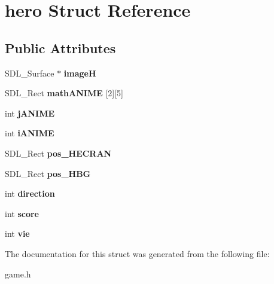 \hypertarget{structhero}{}\section{hero Struct Reference}
\label{structhero}
\subsection*{Public Attributes}
\begin{DoxyCompactItemize}
\item 
\mbox{\label{structhero_a1fdbbfab5e8472c10b6e3026dc8565f5}} 
S\+D\+L\+\_\+\+Surface $\ast$ {\bfseries imageH}
\item 
\mbox{\label{structhero_a54579c3d36a1000267157f6323a2af49}} 
S\+D\+L\+\_\+\+Rect {\bfseries math\+A\+N\+I\+ME} \mbox{[}2\mbox{]}\mbox{[}5\mbox{]}
\item 
\mbox{\label{structhero_acf230ee7f459ba30cb91bf376c5f99d1}} 
int {\bfseries j\+A\+N\+I\+ME}
\item 
\mbox{\label{structhero_a5caa2740b0db2e5b6bb7f35925d35e3c}} 
int {\bfseries i\+A\+N\+I\+ME}
\item 
\mbox{\label{structhero_ada1be34de0e476cafd482e5640b93bfe}} 
S\+D\+L\+\_\+\+Rect {\bfseries pos\+\_\+\+H\+E\+C\+R\+AN}
\item 
\mbox{\label{structhero_a475c2d6d54ce191c3641cd6ad5f61335}} 
S\+D\+L\+\_\+\+Rect {\bfseries pos\+\_\+\+H\+BG}
\item 
\mbox{\label{structhero_a362c6e74cce0d52538c606ba7b05a50f}} 
int {\bfseries direction}
\item 
\mbox{\label{structhero_ad95606e4c167095066a7d314620d99b5}} 
int {\bfseries score}
\item 
\mbox{\label{structhero_a5887140c26217e8f45870ee09224ff94}} 
int {\bfseries vie}
\end{DoxyCompactItemize}


The documentation for this struct was generated from the following file\+:\begin{DoxyCompactItemize}
\item 
game.\+h\end{DoxyCompactItemize}
